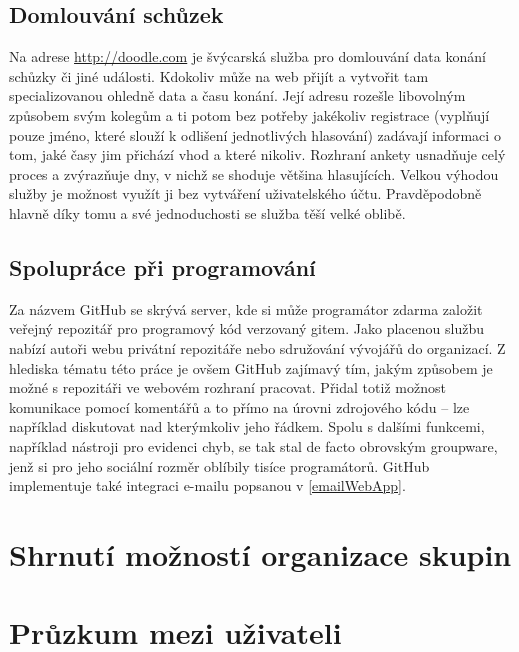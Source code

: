 \documentclass[12pt,oneside,final]{fithesis2}
\begin{document}
\subsection{Domlouvání schůzek}
Na adrese \url{http://doodle.com} je švýcarská služba pro domlouvání data konání schůzky či jiné události. Kdokoliv může na web přijít a vytvořit tam specializovanou  ohledně data a času konání. Její adresu rozešle libovolným způsobem svým kolegům a ti potom bez potřeby jakékoliv registrace (vyplňují pouze jméno, které slouží k odlišení jednotlivých hlasování) zadávají informaci o tom, jaké časy jim přichází vhod a které nikoliv. Rozhraní ankety usnadňuje celý proces a zvýrazňuje dny, v nichž se shoduje většina hlasujících. Velkou výhodou služby je možnost využít ji bez vytváření uživatelského účtu. Pravděpodobně hlavně díky tomu a své jednoduchosti se služba těší velké oblibě.

\subsection{Spolupráce při programování}
Za názvem GitHub se skrývá server, kde si může programátor zdarma založit veřejný repozitář pro programový kód verzovaný gitem. Jako placenou službu nabízí autoři webu privátní repozitáře nebo sdružování vývojářů do organizací. Z hlediska tématu této práce je ovšem GitHub zajímavý tím, jakým způsobem je možné s repozitáři ve webovém rozhraní pracovat. Přidal totiž možnost komunikace pomocí komentářů a to přímo na úrovni zdrojového kódu -- lze například diskutovat nad kterýmkoliv jeho řádkem. Spolu s dalšími funkcemi, například nástroji pro evidenci chyb, se tak stal de facto obrovským groupware, jenž si pro jeho sociální rozměr oblíbily tisíce programátorů. GitHub implementuje také integraci e-mailu popsanou v \ref{emailWebApp}.


\section{Shrnutí možností organizace skupin}



\section{Průzkum mezi uživateli}\label{poll}
\end{document}
